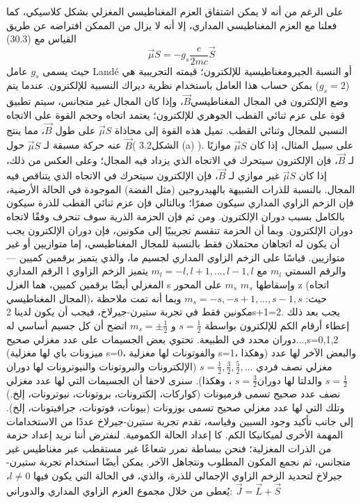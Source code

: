    على الرغم من أنه لا يمكن اشتقاق العزم المغناطيسي المغزلي بشكل كلاسيكي، كما فعلنا مع العزم المغناطيسي المداري، إلا أنه لا يزال من الممكن افتراضه عن طريق القياس مع (30.3)
 \begin{equation}
	\vec{\mu}S={-g}_{s}\frac{e}{2mc}\vec{S}
\end{equation}
حيث يسمى  ${g}_{s}$ عامل Landé أو النسبة الجيرومغناطيسية للإلكترون؛ قيمته التجريبية هي   (${g}_{s}=2$) يمكن حساب هذا العامل باستخدام نظرية ديراك النسبية للإلكترون. عندما يتم وضع الإلكترون في المجال المغناطيسي$\vec{B}$، وإذا كان المجال غير متجانس، سيتم تطبيق قوة على عزم ثنائي القطب الجوهري للإلكترون؛ يعتمد اتجاه وحجم القوة على الاتجاه النسبي للمجال وثنائي القطب. تميل هذه القوة إلى محاذاة $	\vec{\mu}S$ على طول $\vec{B}$، مما ينتج عنه حركة مسبقة لـ $	\vec{\mu}S$ حول $\vec{B}$( الشكل3.2  (a) ). على سبيل المثال، إذا كان $	\vec{\mu}S$ موازيًا لـ $\vec{B}$، فإن الإلكترون سيتحرك في الاتجاه الذي يزداد فيه المجال؛ وعلى العكس من ذلك، إذا كان $	\vec{\mu}S$ غير موازي لـ  $\vec{B}$، فإن الإلكترون سيتحرك في الاتجاه الذي يتناقص فيه المجال. بالنسبة للذرات الشبيهة بالهيدروجين (مثل الفضة) الموجودة في الحالة الأرضية، فإن الزخم الزاوي المداري سيكون صفرًا؛ وبالتالي فإن عزم ثنائي القطب للذرة سيكون بالكامل بسبب دوران الإلكترون.
ومن ثم فإن الحزمة الذرية سوف تنحرف وفقًا لاتجاه دوران الإلكترون. وبما أن الحزمة تنقسم تجريبيًا إلى مكونين، فإن دوران الإلكترون يجب أن يكون له اتجاهان محتملان فقط بالنسبة للمجال المغناطيسي، إما متوازيين أو غير متوازيين.
قياسًا على الزخم الزاوي المداري لجسيم ما، والذي يتميز برقمين كميين — الرقم المداري l والرقم السمتي ${m}_{l}$ مع
${m}_{l}=-l, l+1,..., l-1, l $
 يتميز الزخم الزاوي المغزلي أيضًا برقمين كميين، هما الغزل s وإسقاطها ${m}_{s}$ 
  ${m}_{s}$ على المحور z (اتجاه المجال المغناطيسي)، حيث:
  ${m}_{s}=-s, -s+1,..., s-1, s $ 
   وبما أنه تمت ملاحظة مكونين فقط في تجربة ستيرن-جيرلاخ، فيجب أن يكون لدينا 2s+1=2. يجب بعد ذلك إعطاء أرقام الكم للإلكترون بواسطة $s=\frac{1}{2}$ و $ {m}_{s}=\pm{\frac{1}{2}}$
اتضح أن كل جسيم أساسي له دوران محدد في الطبيعة. تحتوي بعض الجسيمات على عدد مغزلي صحيح...,s=0,1,2 (ميزونات باي لها مغزلية s=0، والفوتونات لها مغزلية s=1، وهكذا) والبعض الآخر لها عدد مغزلي نصف فردي
$s=\frac{1}{2},\frac{3}{2},\frac{5}{2},...$
(الإلكترونات والبروتونات والنيوترونات لها دوران $ s=\frac{1}{2}$ والدلتا لها دوران$ s=\frac{3}{2}$ ،
 وهكذا). سنرى لاحقا أن الجسيمات التي لها عدد مغزلي نصف عدد صحيح تسمى فرميونات (كواركات، إلكترونات، بروتونات، نيوترونات، إلخ.) وتلك التي لها عدد مغزلي صحيح تسمى بوزونات (بيونات، فوتونات، جرافيتونات، إلخ).
إلى جانب تأكيد وجود السبين وقياسه، تقدم تجربة ستيرن-جيرلاخ عددًا من الاستخدامات المهمة الأخرى لميكانيكا الكم. كا إعداد الحالة الكمومية. لنفترض أننا نريد إعداد حزمة من الذرات المغزلية؛ فنحن ببساطة نمرر شعاعًا غير مستقطب عبر مغناطيس غير متجانس، ثم نجمع المكون المطلوب ونتجاهل الآخر. يمكن أيضًا استخدام تجربة ستيرن-جيرلاخ لتحديد الزخم الزاوي الإجمالي للذرة، والذي، في الحالة التي يكون فيها 
$l\neq0 $، يُعطى من خلال مجموع العزم الزاوي المداري والدوراني: $\vec{J}=\vec{L}+\vec{S}$

